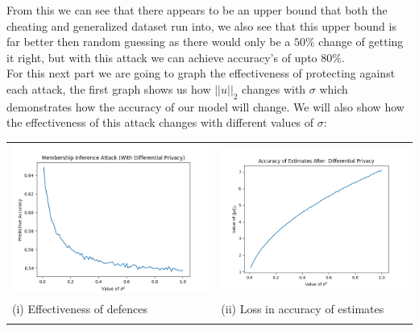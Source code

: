 \documentclass{article}
\begin{document}
\begin{titlepage}
\begin{tabular}{ll}
\end{tabular}

From this we can see that there appears to be an upper bound that both the cheating and generalized dataset run into, we also see that this upper bound is far better then random guessing as there would only be a $50\%$ change of getting it right, but with this attack we can achieve accuracy's of upto $80\%$. \\

For this next part we are going to graph the effectiveness of protecting against each attack, the first graph shows us how $||u||_2$ changes with $\sigma$ which demonstrates how the accuracy of our model will change. We will also show how the effectiveness of this attack changes with different values of $\sigma$:

\begin{tabular}{ll}

 \includegraphics[width=.5\linewidth]{4b.png} &  \includegraphics[width=.5\linewidth]{Q4B.png}\\
 \hfil (i) Effectiveness of defences  \hfil & \hfil (ii) Loss in accuracy of estimates \hfil \\\\
 

\end{tabular}
\end{titlepage}
\end{document}
